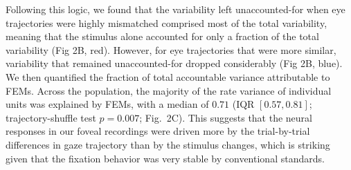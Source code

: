 \documentclass{lite}
\begin{document}
Following this logic, we found that the variability left unaccounted-for when eye trajectories were highly mismatched comprised most of the total variability, meaning that the stimulus alone accounted for only a fraction of the total variability (Fig 2B, red). However, for eye trajectories that were more similar, variability that remained unaccounted-for dropped considerably (Fig 2B, blue). 
We then quantified the fraction of total accountable variance attributable to FEMs. Across the population, the majority of the rate variance of individual units was explained by FEMs, with a median of $0.71$ (IQR $[0.57, 0.81]$; trajectory-shuffle test $p = 0.007$; Fig.~2C). This suggests that the neural responses in our foveal recordings were driven more by the trial-by-trial differences in gaze trajectory than by the stimulus changes, which is striking given that the fixation behavior was very stable by conventional standards. 
\end{document}
